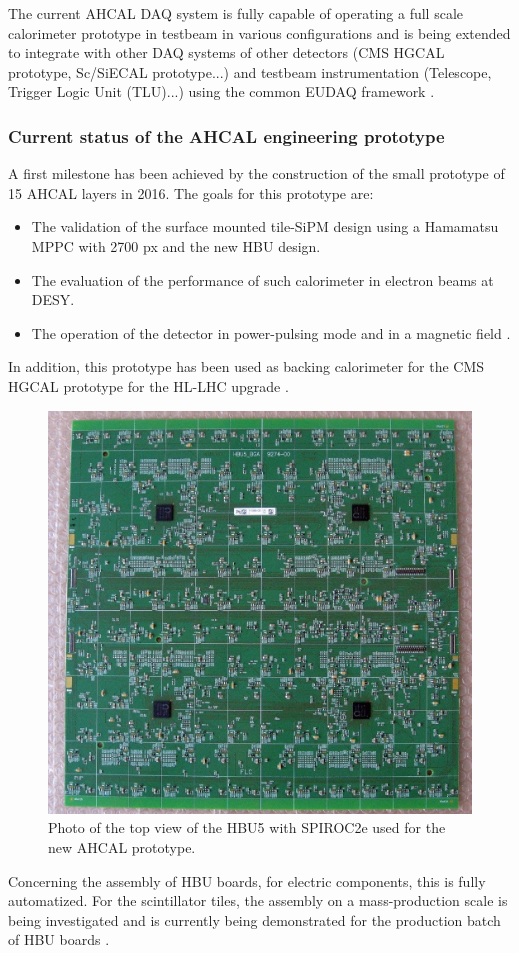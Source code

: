 The current AHCAL DAQ system is fully capable of operating a full scale calorimeter prototype in testbeam in various configurations and is being extended to integrate with other DAQ systems of other detectors (CMS HGCAL prototype, Sc/SiECAL prototype...) and testbeam instrumentation (Telescope, Trigger Logic Unit (TLU)...) using the common EUDAQ framework \cite{Kvasnicka:CR_IEEE2016, Kvasnicka:2017bpx, Wing:2296332}.

\subsubsection{Current status of the AHCAL engineering prototype}

A first milestone has been achieved by the construction of the small prototype of 15 AHCAL layers in 2016. The goals for this prototype are:
\begin{itemize}
  \item The validation of the surface mounted tile-SiPM design using a Hamamatsu MPPC with 2700 px and the new HBU design.
  \item The evaluation of the performance of such calorimeter in electron beams at DESY.
  \item The operation of the detector in power-pulsing mode and in a magnetic field \cite{CR_IEEE2017}.
  \end{itemize}

In addition, this prototype has been used as backing calorimeter for the CMS HGCAL prototype for the HL-LHC upgrade \cite{Felix:AHCALMain2017_HGHCAL}.

\begin{figure}[htbp!]
  \centering
  \includegraphics[width=0.45\linewidth]{chap3/fig/HBU5_BGA.png}
  \caption{Photo of the top view of the HBU5 with SPIROC2e used for the new AHCAL prototype.} \label{fig:HBU5_BGA}
\end{figure}

Concerning the assembly of HBU boards, for electric components, this is fully automatized. For the scintillator tiles, the assembly on a mass-production scale is being investigated and is currently being demonstrated for the production batch of HBU boards \cite{Phi:AHCALMain2017}.

